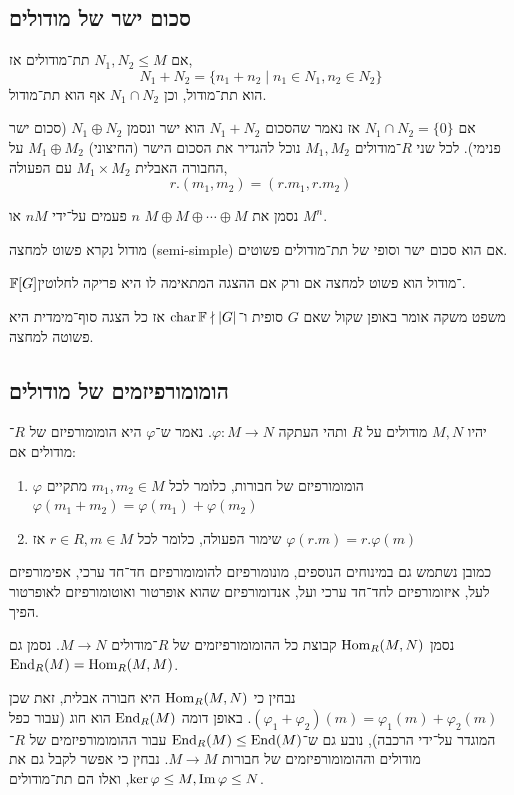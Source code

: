 \subsection{סכום ישר של מודולים}
\begin{proposition}
	אם $N_1, N_2 \le M$ תת־מודולים אז,
	\[
		N_1 + N_2
		= \{ n_1 + n_2 \mid n_1 \in N_1, n_2 \in N_2 \}
	\]
	הוא תת־מודול, וכן $N_1 \cap N_2$ אף הוא תת־מודול.
\end{proposition}
\begin{definition}
	אם $N_1 \cap N_2 = \{ 0 \}$ אז נאמר שהסכום $N_1 + N_2$ הוא ישר ונסמן $N_1 \oplus N_2$ (סכום ישר פנימי).
	לכל שני $R$־מודולים $M_1, M_2$ נוכל להגדיר את הסכום הישר (החיצוני) $M_1 \oplus M_2$ על החבורה האבלית $M_1 \times M_2$ עם הפעולה,
	\[
		r . (m_1, m_2)
		= (r . m_1, r . m_2)
	\]
\end{definition}
\begin{notation}
	נסמן את $M \oplus M \oplus \cdots \oplus M$ $n$ פעמים על־ידי $n M$ או $M^n$.
\end{notation}
\begin{definition}
	מודול נקרא פשוט למחצה (semi-simple) אם הוא סכום ישר וסופי של תת־מודולים פשוטים.
\end{definition}
\begin{proposition}
	$\mathbb{F}[G]$־מודול הוא פשוט למחצה אם ורק אם ההצגה המתאימה לו היא פריקה לחלוטין.
\end{proposition}
משפט משקה אומר באופן שקול שאם $G$ סופית ו־$\operatorname{char} \mathbb{F} \nmid |G|$ אז כל הצגה סוף־מימדית היא פשוטה למחצה.

\subsection{הומומורפיזמים של מודולים}
\begin{definition}
	יהיו $M, N$ מודולים על $R$ ותהי העתקה $\varphi : M \to N$.
	נאמר ש־$\varphi$ היא הומומורפיזם של $R$־מודולים אם:
	\begin{enumerate}
		\item $\varphi$ הומומורפיזם של חבורות, כלומר לכל $m_1, m_2 \in M$ מתקיים $\varphi(m_1 + m_2) = \varphi(m_1) + \varphi(m_2)$
		\item שימור הפעולה, כלומר לכל $r \in R, m \in M$ אז $\varphi(r . m) = r . \varphi(m)$
	\end{enumerate}
\end{definition}
כמובן נשתמש גם במינוחים הנוספים, מונומורפיזם להומומורפיזם חד־חד ערכי, אפימורפיזם לעל, איזומורפיזם לחד־חד ערכי ועל, אנדומורפיזם שהוא אופרטור ואוטומורפיזם לאופרטור הפיך.
\begin{notation}
	נסמן $\operatorname{Hom}_R(M, N)$ קבוצת כל ההומומורפיזמים של $R$־מודולים $M \to N$.
	נסמן גם $\operatorname{End}_R(M) = \operatorname{Hom}_R(M, M)$.
\end{notation}
נבחין כי $\operatorname{Hom}_R(M, N)$ היא חבורה אבלית, זאת שכן $(\varphi_1 + \varphi_2)(m) = \varphi_1(m) + \varphi_2(m)$.
באופן דומה $\operatorname{End}_R(M)$ הוא חוג (עבור כפל המוגדר על־ידי הרכבה), נובע גם ש־$\operatorname{End}_R(M) \le \operatorname{End}(M)$ עבור ההומומורפיזמים של $R$־מודולים וההומומורפיזמים של חבורות $M \to M$.
נבחין כי אפשר לקבל גם את $\ker \varphi \le M, \operatorname{Im} \varphi \le N$, ואלו הם תת־מודולים.

